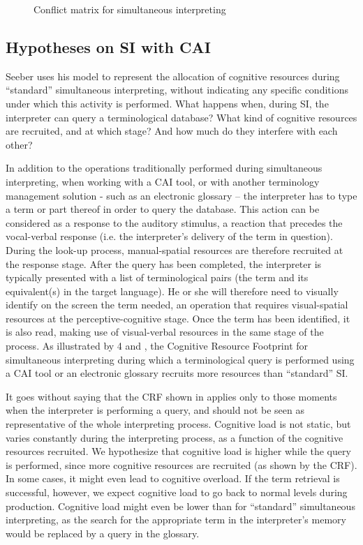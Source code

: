 \documentclass[output=paper]{langsci/langscibook}
\begin{document}
\begin{figure}
\caption{Conflict matrix for simultaneous interpreting \citep[1385]{Seeber2007}\label{fig:prandi:3}}
\end{figure}

\subsection{Hypotheses on \textsc{SI} with \textsc{CAI}}\label{sec:prandi:2.2}
Seeber uses his model to represent the allocation of cognitive resources during ``standard'' simultaneous interpreting, without indicating any specific conditions under which this activity is performed. What happens when, during \textsc{SI}, the interpreter can query a terminological database? What kind of cognitive resources are recruited, and at which stage? And how much do they interfere with each other?

In addition to the operations traditionally performed during simultaneous interpreting, when working with a \textsc{CAI} tool, or with another terminology management solution - such as an electronic glossary – the interpreter has to type a term or part thereof in order to query the database. This action can be considered as a response to the auditory stimulus, a reaction that precedes the vocal-verbal response (i.e. the interpreter’s delivery of the term in question). During the look-up process, manual-spatial resources are therefore recruited at the response stage. After the query has been completed, the interpreter is typically presented with a list of terminological pairs (the term and its equivalent(s) in the target language). He or she will therefore need to visually identify on the screen the term needed, an operation that requires visual-spatial resources at the perceptive-cognitive stage. Once the term has been identified, it is also read, making use of visual-verbal resources in the same stage of the process. As illustrated by 4 and , the Cognitive Resource Footprint for simultaneous interpreting during which a terminological query is performed using a \textsc{CAI} tool or an electronic glossary recruits more resources than ``standard'' \textsc{SI}. 

It goes without saying that the \textsc{CRF} shown in  applies only to those moments when the interpreter is performing a query, and should not be seen as representative of the whole interpreting process. Cognitive load is not static, but varies constantly during the interpreting process, as a function of the cognitive resources recruited. We hypothesize that cognitive load is higher while the query is performed, since more cognitive resources are recruited (as shown by the \textsc{CRF}). In some cases, it might even lead to cognitive overload. If the term retrieval is successful, however, we expect cognitive load to go back to normal levels during production. Cognitive load might even be lower than for ``standard'' simultaneous interpreting, as the search for the appropriate term in the interpreter’s memory would be replaced by a query in the glossary.
\end{document}
